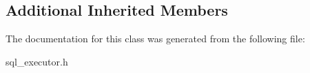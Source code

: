 \subsection*{Additional Inherited Members}


The documentation for this class was generated from the following file\+:\begin{DoxyCompactItemize}
\item 
sql\+\_\+executor.\+h\end{DoxyCompactItemize}
